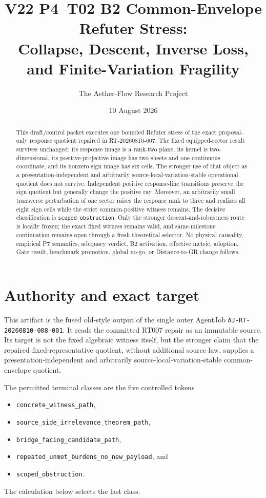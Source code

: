 \documentclass[11pt]{article}
\title{V22 P4--T02 B2 Common-Envelope Refuter Stress:\\
Collapse, Descent, Inverse Loss, and Finite-Variation Fragility}
\author{The Aether-Flow Research Project}
\date{10 August 2026}
\begin{document}
\maketitle

\begin{abstract}
This draft/control packet executes one bounded Refuter stress of the exact
proposal-only response quotient repaired in RT-20260810-007.  The fixed
equipped-sector result survives unchanged: its response image is a rank-two
plane, its kernel is two-dimensional, its positive-projective image has two
sheets and one continuous coordinate, and its nonzero sign image has six
cells.  The stronger use of that object as a presentation-independent and
arbitrarily source-local-variation-stable operational quotient does not
survive.  Independent positive response-line transitions preserve the sign
quotient but generally change the positive ray.  Moreover, an arbitrarily
small transverse perturbation of one sector raises the response rank to three
and realizes all eight sign cells while the strict common-positive witness
remains.  The decisive classification is
\texttt{scoped\_obstruction}.  Only the stronger descent-and-robustness route is
locally frozen; the exact fixed witness remains valid, and same-milestone
continuation remains open through a fresh theoretical selector.  No physical
causality, empirical P7 semantics, adequacy verdict, B2 activation, effective
metric, adoption, Gate result, benchmark promotion, global no-go, or
Distance-to-GR change follows.
\end{abstract}

\section{Authority and exact target}

This artifact is the fused old-style output of the single outer AgentJob
\texttt{AJ-RT-20260810-008-001}.  It reads the committed RT007 repair as an
immutable source.  Its target is not the fixed algebraic witness itself, but
the stronger claim that the repaired fixed-representative quotient, without
additional source law, supplies a presentation-independent and arbitrarily
source-local-variation-stable common-envelope quotient.

The permitted terminal classes are the five controlled tokens
\begin{itemize}
  \item \nolinkurl{concrete_witness_path},
  \item \nolinkurl{source_side_irrelevance_theorem_path},
  \item \nolinkurl{bridge_facing_candidate_path},
  \item \nolinkurl{repeated_unmet_burdens_no_new_payload}, and
  \item \nolinkurl{scoped_obstruction}.
\end{itemize}
The calculation below selects the last class.
\end{document}
